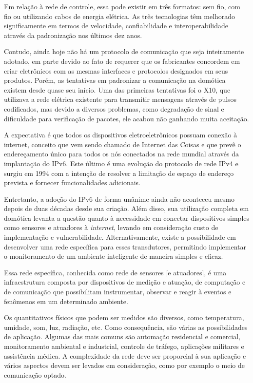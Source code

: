 Em relação à rede de controle, essa pode existir em três formatos: sem fio, com fio ou utilizando cabos de
energia elétrica. As três tecnologias têm melhorado significamente em termos de velocidade, confiabilidade e
interoperabilidade através da padronização nos últimos dez anos. \cite{kyas2013}

Contudo, ainda hoje não há um protocolo de comunicação que seja inteiramente adotado, em parte devido ao fato
de requerer que os fabricantes concordem em criar eletrônicos com as mesmas interfaces e protocolos designados
em seus produtos. Porém, as tentativas em padronizar a comunicação na domótica existem desde quase seu início.
Uma das primeiras tentativas foi o X10, que utilizava a rede elétrica existente para transmitir mensagens
através de pulsos codificados, mas devido a diversos problemas, como degradação de sinal e dificuldade para
verificação de pacotes, ele acabou não ganhando muita aceitação. \cite{riley2012}

A expectativa é que todos os dispositivos eletroeletrônicos possuam conexão à internet, conceito que vem sendo
chamado de Internet das Coisas e que prevê o endereçamento único para todos os nós conectados na rede mundial
através da implantação do IPv6. Este último é uma evolução do protocolo de rede IPv4 e surgiu em 1994 com a
intenção de resolver a limitação de espaço de endereço prevista e fornecer funcionalidades adicionais.
\cite{hagen2002}

Entretanto, a adoção do IPv6 de forma unânime ainda não aconteceu mesmo depois de duas décadas desde sua
criação. Além disso, sua utilização completa em domótica levanta a questão quanto à necessidade em conectar
dispositivos simples como sensores e atuadores à \textit{internet}, levando em consideração custo de
implementação e vulnerabilidade. Alternativamente, existe a possibilidade em desenvolver uma rede específica
para esses transdutores, permitindo implementar o monitoramento de um ambiente inteligente de maneira simples
e eficaz.

Essa rede específica, conhecida como rede de sensores [e atuadores], é uma infraestrutura composta por
dispositivos de medição e atuação, de computação e de comunicação que possibilitam instrumentar, observar e
reagir à eventos e fenômenos em um determinado ambiente. \cite{sohraby_minoli_znati2007}

Os quantitativos físicos que podem ser medidos são diversos, como temperatura, umidade, som, luz, radiação,
etc. Como consequência, são várias as possibilidades de aplicação. Algumas das mais comuns são automação
residencial e comercial, monitoramento ambiental e industrial, controle de tráfego, aplicações militares e
assistência médica. A complexidade da rede deve ser proporcial à sua aplicação e vários aspectos devem ser
levados em consideração, como por exemplo o meio de comunicação optado.  \cite{kuorilehto2007}

